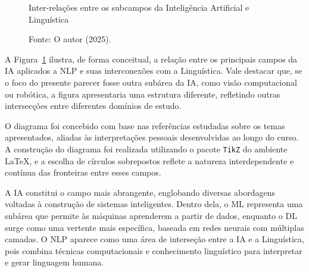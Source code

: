 \begin{figure}[h!]
\centering
\caption{Inter-relações entre os subcampos da Inteligência Artificial e Linguística}
\caption*{Fonte: O autor (2025).}
\label{fig:vennIA}
\end{figure}

A Figura~\ref{fig:vennIA} ilustra, de forma conceitual, a relação entre os principais campos da IA aplicados a NLP e suas interconexões com a Linguística. Vale destacar que, se o foco do presente parecer fosse outra subárea da IA, como visão computacional ou robótica, a figura apresentaria uma estrutura diferente, refletindo outras intersecções entre diferentes domínios de estudo.

O diagrama foi concebido com base nas referências estudadas sobre os temas apresentados, aliadas às interpretações pessoais desenvolvidas ao longo do curso. A construção do diagrama foi realizada utilizando o pacote \texttt{TikZ} do ambiente \LaTeX{}, e a escolha de círculos sobrepostos reflete a natureza interdependente e contínua das fronteiras entre esses campos.

A IA constitui o campo mais abrangente, englobando diversas abordagens voltadas à construção de sistemas inteligentes. Dentro dela, o ML representa uma subárea que permite às máquinas aprenderem a partir de dados, enquanto o DL surge como uma vertente mais específica, baseada em redes neurais com múltiplas camadas. 
O NLP aparece como uma área de interseção entre a IA e a Linguística, pois combina técnicas computacionais e conhecimento linguístico para interpretar e gerar linguagem humana. 

